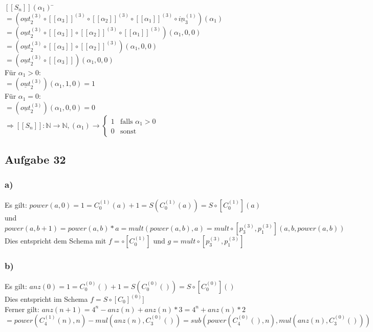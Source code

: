 \documentclass[11pt]{amsart}
\begin{document}
\begin{tabbing}
$[[S_n]](\alpha_1)$ \= $= (\underline{out}^{(3)}_2 \circ [[\alpha_3]]^{(3)}  
\circ [[\alpha_2]]^{(3)} \circ [[\alpha_1]]^{(3)} \circ \underline{in}^{(1)}_3)(\alpha_1)$ \\
\> $= (\underline{out}^{(3)}_2 \circ [[\alpha_3]] \circ [[\alpha_2]]^{(3)} \circ [[\alpha_1]]^{(3)})(\alpha_1,0,0)$ \\
\> $= (\underline{out}^{(3)}_2 \circ [[\alpha_3]] \circ [[\alpha_2]]^{(3)})(\alpha_1,0,0)$ \\
\> $= (\underline{out}^{(3)}_2 \circ [[\alpha_3]])(\alpha_1,0,0)$ \\
Für $\alpha_1 > 0$: \\
\> $= (\underline{out}^{(3)}_2)(\alpha_1,1,0) = 1$ \\
Für $\alpha_1 = 0$: \\
\> $= (\underline{out}^{(3)}_2)(\alpha_1,0,0) = 0$ \\
$\Rightarrow [[S_n]]: \mathbb{N} \rightarrow \mathbb{N}, (\alpha_1) \rightarrow \begin{cases} 1 &\mbox{falls } \alpha_1>0 \\ 0 &\mbox{sonst} \end{cases}$
\end{tabbing}

\subsection*{Aufgabe 32}

\subsubsection*{a)} 
Es gilt: $power(a,0) = 1 = C_0^{(1)}(a) + 1 = S(C_0^{(1)}(a)) = 
S \circ [C_0^{(1)}](a)$ \\
und $power(a,b+1) = power(a,b)*a = mult(power(a,b),a) =
mult \circ [p_3^{(3)},p_1^{(3)}](a,b,power(a,b))$ \\
Dies entspricht dem Schema mit $f = \circ [C_0^{(1)}]$ und $g = mult \circ [p_3^{(3)},p_1^{(3)}]$ \\

\subsubsection*{b)}
Es gilt: $anz(0) = 1 = C_0^{(0)}() + 1 = S(C_0^{(0)}()) = 
S \circ [C_0^{(0)}]()$ \\
Dies entspricht im Schema $f = S \circ [C_0]^{(0)}]$ \\
Ferner gilt: $anz(n+1) = 4^n - anz(n) + anz(n) * 3 = 4^n + anz(n) * 2$ \\
$= power(C_4^{(1)}(n),n) - mul(anz(n),C_3^{(0)}()) = sub(power(C_4^{(0)}(),n),mul(anz(n),C_3^{(0)}()))$ \\
\end{document}
